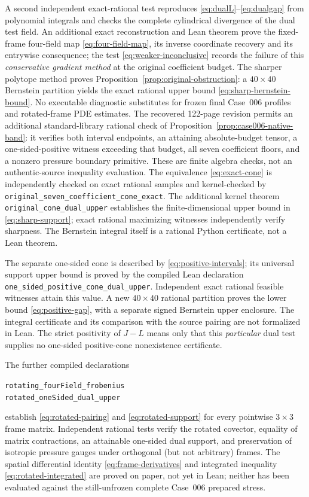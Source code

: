 \documentclass[11pt,a4paper]{article}
\theoremstyle{plain}
\theoremstyle{definition}
\begin{document}
A second independent exact-rational test reproduces
\eqref{eq:dualL}--\eqref{eq:dualgap} from polynomial integrals and
checks the complete cylindrical divergence of the dual test field.
An additional exact reconstruction and Lean theorem prove the
fixed-frame four-field map \eqref{eq:four-field-map}, its inverse
coordinate recovery and its
entrywise consequence; the test \eqref{eq:weaker-inconclusive}
records the failure of this \emph{conservative gradient method}
at the original coefficient budget. The sharper polytope method
proves Proposition~\ref{prop:original-obstruction}: a $40\times40$
Bernstein partition yields the exact rational upper bound
\eqref{eq:sharp-bernstein-bound}. No executable diagnostic substitutes
for frozen final Case~006 profiles and rotated-frame PDE estimates.
The recovered 122-page revision permits an additional
standard-library rational check of
Proposition~\ref{prop:case006-native-band}: it verifies both
interval endpoints, an attaining absolute-budget tensor, a
one-sided-positive witness exceeding that budget, all seven
coefficient floors, and a nonzero pressure boundary primitive.
These are finite algebra checks, not an authentic-source inequality
evaluation.
The equivalence \eqref{eq:exact-cone} is independently checked on
exact rational samples and kernel-checked by
\texttt{original\_seven\_coefficient\_cone\_exact}.
The additional kernel theorem \texttt{original\_cone\_dual\_upper}
establishes the finite-dimensional upper bound in
\eqref{eq:sharp-support}; exact rational maximizing witnesses
independently verify sharpness. The Bernstein integral itself is
a rational Python certificate, not a Lean theorem.

The separate one-sided cone is described by
\eqref{eq:positive-intervals}; its universal support upper bound
is proved by the compiled Lean declaration
\texttt{one\_sided\_positive\_cone\_dual\_upper}. Independent exact
rational feasible witnesses attain this value. A new $40\times40$
rational partition proves the lower bound \eqref{eq:positive-gap},
with a separate signed Bernstein upper enclosure. The integral
certificate and its comparison with the source pairing are not
formalized in Lean. The strict positivity of $J-L$ means only
that this \emph{particular} dual test supplies no one-sided
positive-cone nonexistence certificate.

The further compiled declarations
\begin{center}
\small
\texttt{rotating\_fourField\_frobenius}\\[2pt]
\texttt{rotated\_oneSided\_dual\_upper}
\end{center}
establish
\eqref{eq:rotated-pairing} and \eqref{eq:rotated-support} for
every pointwise $3\times3$ frame matrix. Independent rational
tests verify the rotated covector, equality of matrix contractions,
an attainable one-sided dual support, and preservation of isotropic
pressure gauges under orthogonal (but not arbitrary) frames.
The spatial differential identity \eqref{eq:frame-derivatives} and
integrated inequality \eqref{eq:rotated-integrated} are proved on
paper, not yet in Lean; neither has been evaluated against the
still-unfrozen complete Case~006 prepared stress.
\end{document}
